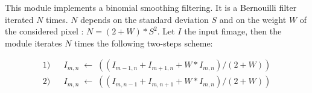 This module implements a binomial smoothing filtering. 
It is a Bernouilli filter iterated $N$ times. 
$N$ depends on the standard deviation $S$ and on the weight $W$ of the considered pixel : $N=(2+W)*S^{2}$. 
Let $I$ the input fimage, then the module iterates $N$ times
the following two-steps scheme:

\begin{eqnarray*}
1) && I_{m,n} \;\longleftarrow\; ((I_{m-1,n}+I_{m+1,n}+W*I_{m,n})/(2+W)) \\
2) && I_{m,n} \;\longleftarrow\; ((I_{m,n-1}+I_{m,n+1}+W*I_{m,n})/(2+W))
\end{eqnarray*}

